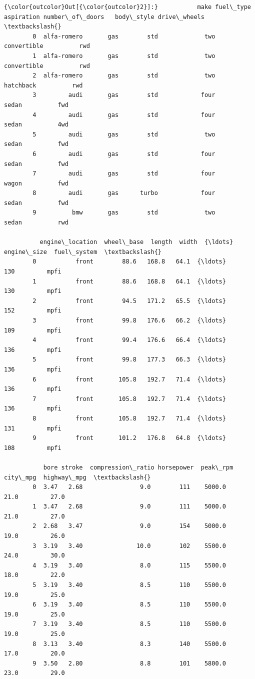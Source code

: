 \documentclass[11pt]{article}
\begin{document}
\begin{Verbatim}[commandchars=\\\{\}]
{\color{outcolor}Out[{\color{outcolor}2}]:}           make fuel\_type aspiration number\_of\_doors   body\_style drive\_wheels  \textbackslash{}
        0  alfa-romero       gas        std             two  convertible          rwd   
        1  alfa-romero       gas        std             two  convertible          rwd   
        2  alfa-romero       gas        std             two    hatchback          rwd   
        3         audi       gas        std            four        sedan          fwd   
        4         audi       gas        std            four        sedan          4wd   
        5         audi       gas        std             two        sedan          fwd   
        6         audi       gas        std            four        sedan          fwd   
        7         audi       gas        std            four        wagon          fwd   
        8         audi       gas      turbo            four        sedan          fwd   
        9          bmw       gas        std             two        sedan          rwd   
        
          engine\_location  wheel\_base  length  width  {\ldots}    engine\_size  fuel\_system  \textbackslash{}
        0           front        88.6   168.8   64.1  {\ldots}            130         mpfi   
        1           front        88.6   168.8   64.1  {\ldots}            130         mpfi   
        2           front        94.5   171.2   65.5  {\ldots}            152         mpfi   
        3           front        99.8   176.6   66.2  {\ldots}            109         mpfi   
        4           front        99.4   176.6   66.4  {\ldots}            136         mpfi   
        5           front        99.8   177.3   66.3  {\ldots}            136         mpfi   
        6           front       105.8   192.7   71.4  {\ldots}            136         mpfi   
        7           front       105.8   192.7   71.4  {\ldots}            136         mpfi   
        8           front       105.8   192.7   71.4  {\ldots}            131         mpfi   
        9           front       101.2   176.8   64.8  {\ldots}            108         mpfi   
        
           bore stroke  compression\_ratio horsepower  peak\_rpm  city\_mpg  highway\_mpg  \textbackslash{}
        0  3.47   2.68                9.0        111    5000.0      21.0         27.0   
        1  3.47   2.68                9.0        111    5000.0      21.0         27.0   
        2  2.68   3.47                9.0        154    5000.0      19.0         26.0   
        3  3.19   3.40               10.0        102    5500.0      24.0         30.0   
        4  3.19   3.40                8.0        115    5500.0      18.0         22.0   
        5  3.19   3.40                8.5        110    5500.0      19.0         25.0   
        6  3.19   3.40                8.5        110    5500.0      19.0         25.0   
        7  3.19   3.40                8.5        110    5500.0      19.0         25.0   
        8  3.13   3.40                8.3        140    5500.0      17.0         20.0   
        9  3.50   2.80                8.8        101    5800.0      23.0         29.0   
        

\end{Verbatim}
\end{document}
